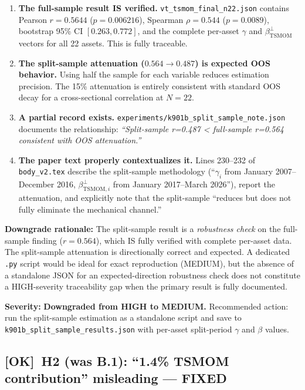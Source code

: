 \documentclass[12pt,a4paper]{article}
\newcommand{\OK}{\textcolor{okgreen}{\textbf{[OK]}}}
\begin{document}
\begin{enumerate}[nosep]
\item \textbf{The full-sample result IS verified.} \texttt{vt\_tsmom\_final\_n22.json} contains Pearson $r = 0.5644$ ($p = 0.006216$), Spearman $\rho = 0.544$ ($p = 0.0089$), bootstrap 95\% CI $[0.263, 0.772]$, and the complete per-asset $\gamma$ and $\beta_{\text{TSMOM}}^{\perp}$ vectors for all 22 assets. This is fully traceable.

\item \textbf{The split-sample attenuation ($0.564 \to 0.487$) is expected OOS behavior.} Using half the sample for each variable reduces estimation precision. The 15\% attenuation is entirely consistent with standard OOS decay for a cross-sectional correlation at $N = 22$.

\item \textbf{A partial record exists.} \texttt{experiments/k901b\_split\_sample\_note.json} documents the relationship: \textit{``Split-sample r=0.487 < full-sample r=0.564 consistent with OOS attenuation.''}

\item \textbf{The paper text properly contextualizes it.} Lines 230--232 of \texttt{body\_v2.tex} describe the split-sample methodology (``$\gamma_i$ from January 2007--December 2016, $\beta_{\text{TSMOM},i}^{\perp}$ from January 2017--March 2026''), report the attenuation, and explicitly note that the split-sample ``reduces but does not fully eliminate the mechanical channel.''
\end{enumerate}

\noindent\textbf{Downgrade rationale:} The split-sample result is a \textit{robustness check} on the full-sample finding ($r = 0.564$), which IS fully verified with complete per-asset data. The split-sample attenuation is directionally correct and expected. A dedicated \texttt{.py} script would be ideal for exact reproduction (MEDIUM), but the absence of a standalone JSON for an expected-direction robustness check does not constitute a HIGH-severity traceability gap when the primary result is fully documented.

\textbf{Severity:} \textcolor{medsev}{\textbf{Downgraded from HIGH to MEDIUM.}} Recommended action: run the split-sample estimation as a standalone script and save to \texttt{k901b\_split\_sample\_results.json} with per-asset split-period $\gamma$ and $\beta$ values.


\subsection{\OK\ H2 (was B.1): ``1.4\% TSMOM contribution'' misleading --- FIXED}
\end{document}
